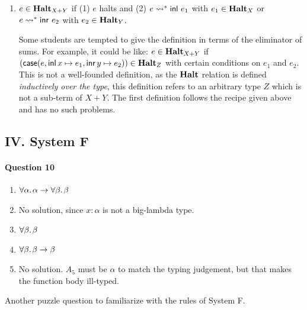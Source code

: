\documentclass[11pt,a4paper,twoside]{article}
\begin{document}
\begin{enumerate}[label=(\alph*)]
    The recipe of defining logical realtions for termination is that a term is in
    $\Halt$ if it reduces to a certain normal form and its sub-terms are also in $\Halt$
    \emph{in a logical way}, which means that it is expected to have be a logical conjunction
    for products, an implication for functions, etc. Therefore, the first form is
    recommended as it follows the recipe. The second form based on eliminators, 
    although equivalent, could fail if applied blindly to some other cases where
    the eliminator refers to some arbitrary type, for instance see the next question.
  \item $e \in \Halt_{X + Y}$ if (1) $e$ halts and
    (2)  $e \leadsto^* \inl\ e_1$ with $e_1 \in \Halt_X$ or $e \leadsto^* \inr\ e_2$
    with $e_2 \in \Halt_Y$.

    Some students are tempted to give the definition in terms of the eliminator of sums.
    For example, it could be like:
    $e \in \Halt_{X + Y}$ if $(\case{e}{x}{y}{e_1}{e_2}) \in \Halt_Z$ with certain conditions
    on $e_1$ and $e_2$. This is not a well-founded definition, as the $\Halt$ relation is
    defined \emph{inductively over the type}, this definition refers to an arbitrary type
    $Z$ which is not a sub-term of $X + Y$. The first definition follows the recipe given
    above and has no such problems.

\end{enumerate}

\subsection*{IV. System F}

\paragraph*{Question 10} 

\begin{enumerate}[label=(\alph*)]
  \item $\fora{\alpha}{\alpha} \to \fora{\beta}{\beta}$
  \item No solution, since $x : \alpha$ is not a big-lambda type.
  \item $\fora{\beta}{\beta}$
  \item $\fora{\beta}{\beta \to \beta}$
  \item No solution. $A_5$ must be $\alpha$ to match the typing judgement, but 
    that makes the function body ill-typed.
\end{enumerate}
%
Another puzzle question to familiarize with the rules of System F.
\end{document}
